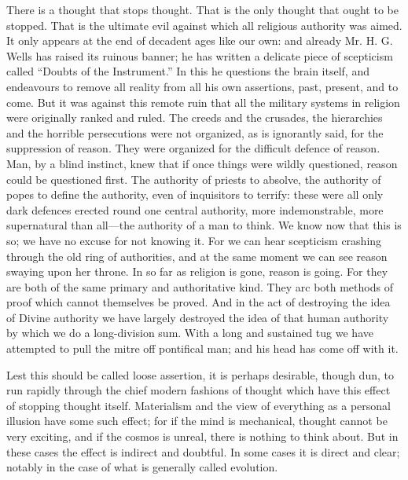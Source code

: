 \documentclass{book}
\begin{document}
There is a thought that stops thought. That is the only thought that ought to be stopped. That is the ultimate evil against which all religious authority was aimed. It only appears at the end of decadent ages like our own: and already Mr. H. G. Wells has raised its ruinous banner; he has written a delicate piece of scepticism called “Doubts of the Instrument.” In this he questions the brain itself, and endeavours to remove all reality from all his own assertions, past, present, and to come. But it was against this remote ruin that all the military systems in religion were originally ranked and ruled. The creeds and the crusades, the hierarchies and the horrible persecutions were not organized, as is ignorantly said, for the suppression of reason. They were organized for the difficult defence of reason. Man, by a blind instinct, knew that if once things were wildly questioned, reason could be questioned first. The authority of priests to absolve, the authority of popes to define the authority, even of inquisitors to terrify: these were all only dark defences erected round one central authority, more indemonstrable, more supernatural than all—the authority of a man to think. We know now that this is so; we have no excuse for not knowing it. For we can hear scepticism crashing through the old ring of authorities, and at the same moment we can see reason swaying upon her throne. In so far as religion is gone, reason is going. For they are both of the same primary and authoritative kind. They arc both methods of proof which cannot themselves be proved. And in the act of destroying the idea of Divine authority we have largely destroyed the idea of that human authority by which we do a long-division sum. With a long and sustained tug we have attempted to pull the mitre off pontifical man; and his head has come off with it.

Lest this should be called loose assertion, it is perhaps desirable, though dun, to run rapidly through the chief modern fashions of thought which have this effect of stopping thought itself. Materialism and the view of everything as a personal illusion have some such effect; for if the mind is mechanical, thought cannot be very exciting, and if the cosmos is unreal, there is nothing to think about. But in these cases the effect is indirect and doubtful. In some cases it is direct and clear; notably in the case of what is generally called evolution.
\end{document}
